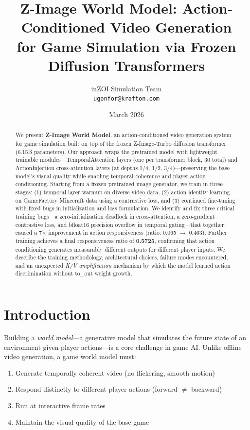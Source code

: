 \documentclass[10pt,twocolumn]{article}
\title{\textbf{Z-Image World Model: Action-Conditioned Video Generation\\
for Game Simulation via Frozen Diffusion Transformers}}
\author{
  inZOI Simulation Team \\
  \texttt{ugonfor@krafton.com}
}
\date{March 2026}
\begin{document}
\maketitle

\begin{abstract}
We present \textbf{Z-Image World Model}, an action-conditioned video generation system for game simulation built on top of the frozen Z-Image-Turbo diffusion transformer (6.15B parameters). Our approach wraps the pretrained model with lightweight trainable modules---TemporalAttention layers (one per transformer block, 30 total) and ActionInjection cross-attention layers (at depths 1/4, 1/2, 3/4)---preserving the base model's visual quality while enabling temporal coherence and player action conditioning. Starting from a frozen pretrained image generator, we train in three stages: (1) temporal layer warmup on diverse video data, (2) action identity learning on GameFactory Minecraft data using a contrastive loss, and (3) continued fine-tuning with fixed bugs in initialization and loss formulation. We identify and fix three critical training bugs---a zero-initialization deadlock in cross-attention, a zero-gradient contrastive loss, and bfloat16 precision overflow in temporal gating---that together caused a 7$\times$ improvement in action responsiveness (ratio: 0.065 $\to$ 0.463). Further training achieves a final responsiveness ratio of \textbf{0.5725}, confirming that action conditioning generates measurably different outputs for different player inputs. We describe the training methodology, architectural choices, failure modes encountered, and an unexpected \textit{K/V amplification} mechanism by which the model learned action discrimination without to\_out weight growth.
\end{abstract}

\section{Introduction}

Building a \emph{world model}---a generative model that simulates the future state of an environment given player actions---is a core challenge in game AI. Unlike offline video generation, a game world model must:
\begin{enumerate}
  \item Generate temporally coherent video (no flickering, smooth motion)
  \item Respond distinctly to different player actions (forward $\neq$ backward)
  \item Run at interactive frame rates
  \item Maintain the visual quality of the base game
\end{enumerate}
\end{document}
